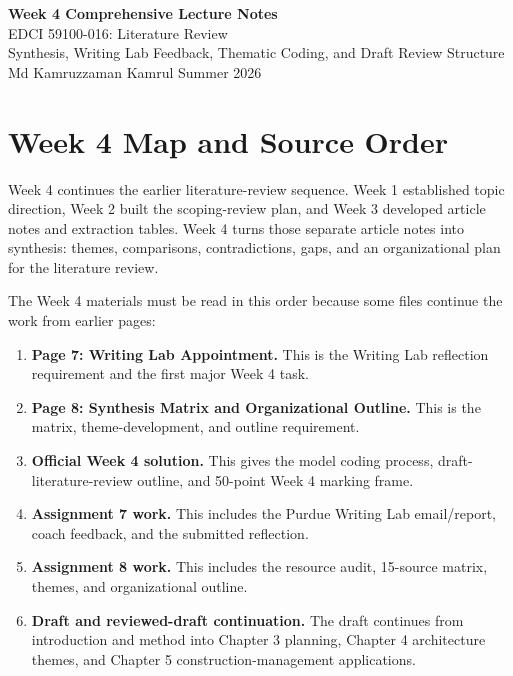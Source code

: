 \documentclass[10pt,letterpaper]{article}
\begin{document}
\begin{center}
{\Large\bfseries Week 4 Comprehensive Lecture Notes}\\[0.25em]
{\normalsize EDCI 59100-016: Literature Review}\\
{\normalsize Synthesis, Writing Lab Feedback, Thematic Coding, and Draft Review Structure}\\[0.25em]
{\normalsize Md Kamruzzaman Kamrul \textbar{} Summer 2026}
\end{center}

\tableofcontents
\newpage

\section{Week 4 Map and Source Order}

Week 4 continues the earlier literature-review sequence. Week 1 established topic direction, Week 2 built the scoping-review plan, and Week 3 developed article notes and extraction tables. Week 4 turns those separate article notes into synthesis: themes, comparisons, contradictions, gaps, and an organizational plan for the literature review.

The Week 4 materials must be read in this order because some files continue the work from earlier pages:

\begin{enumerate}
\item \textbf{Page 7: Writing Lab Appointment.} This is the Writing Lab reflection requirement and the first major Week 4 task.
\item \textbf{Page 8: Synthesis Matrix and Organizational Outline.} This is the matrix, theme-development, and outline requirement.
\item \textbf{Official Week 4 solution.} This gives the model coding process, draft-literature-review outline, and 50-point Week 4 marking frame.
\item \textbf{Assignment 7 work.} This includes the Purdue Writing Lab email/report, coach feedback, and the submitted reflection.
\item \textbf{Assignment 8 work.} This includes the resource audit, 15-source matrix, themes, and organizational outline.
\item \textbf{Draft and reviewed-draft continuation.} The draft continues from introduction and method into Chapter 3 planning, Chapter 4 architecture themes, and Chapter 5 construction-management applications.
\end{enumerate}
\end{document}
